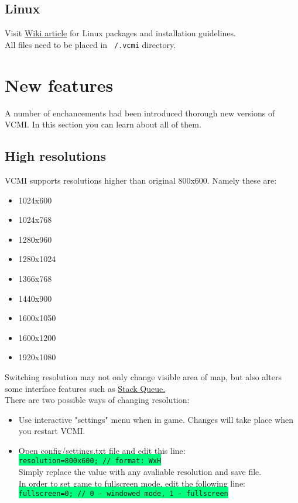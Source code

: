\documentclass[a4size,final]{article}
\begin{document}
\subsection{Linux}
Visit \href{http://wiki.vcmi.eu/index.php?title=Installation_on_Linux}{Wiki article} for Linux packages and installation guidelines.\\
All files need to be placed in \texttt{~/.vcmi} directory.
\newpage
\section{New features}
A number of enchancements had been introduced thorough new versions of VCMI. In this section you can learn about all of them.
\subsection{High resolutions}
VCMI supports resolutions higher than original 800x600. Namely these are:
\begin{itemize}
\item 1024x600
\item 1024x768
\item 1280x960
\item 1280x1024
\item 1366x768 %
\item 1440x900
\item 1600x1050
\item 1600x1200
\item 1920x1080
\end{itemize}
Switching resolution may not only change visible area of map, but also alters some interface features such as \hyperref[Stack_Queue]{Stack Queue.}\\
There are two possible ways of changing resolution:
\begin{itemize}
\item Use interactive "settings" menu when in game. Changes will take place when you restart VCMI.
\item Open config/settings.txt file and edit this line:\\
\colorbox{SpringGreen}{\texttt{resolution=800x600; // format: WxH}}\\
Simply replace the value with any avaliable resolution and save file. \medskip\\
In order to set game to fullscreen mode, edit the following line:\\
\colorbox{SpringGreen}{\texttt{fullscreen=0; // 0 - windowed mode, 1 - fullscreen}}\\
\end{itemize}
\label{Mods}
\end{document}

